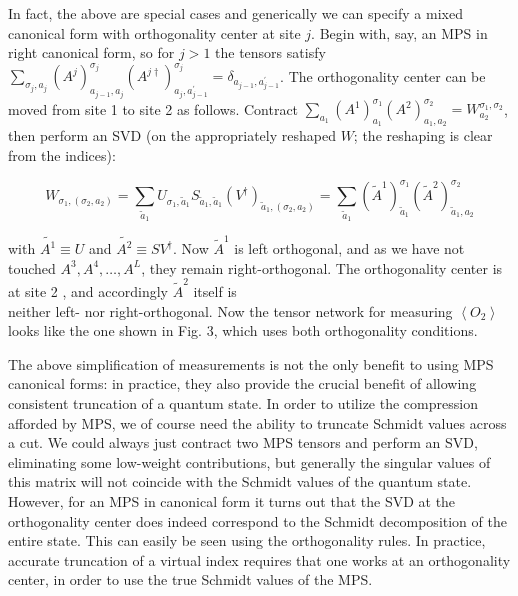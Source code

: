 \documentclass[12pt]{article}
\begin{document}
In fact, the above are special cases and generically we can specify a mixed canonical form with orthogonality center at site $j$. Begin with, say, an MPS in right canonical form, so for $j>1$ the tensors satisfy $\sum_{\sigma_{j}, a_{j}}\left(A^{j}\right)_{a_{j-1}, a_{j}}^{\sigma_{j}}\left(A^{j \dagger}\right)_{a_{j}, a_{j-1}^{\prime}}^{\sigma_{j}}=\delta_{a_{j-1}, a_{j-1}^{\prime}}$. The orthogonality center can be moved from site 1 to site 2 as follows. Contract $\sum_{a_{1}}\left(A^{1}\right)_{a_{1}}^{\sigma_{1}}\left(A^{2}\right)_{a_{1}, a_{2}}^{\sigma_{2}}=W_{a_{2}}^{\sigma_{1}, \sigma_{2}}$, then perform an SVD (on the appropriately reshaped $W$; the reshaping is clear from the indices):


\begin{equation*}
W_{\sigma_{1},\left(\sigma_{2}, a_{2}\right)}=\sum_{\tilde{a}_{1}} U_{\sigma_{1}, \tilde{a}_{1}} S_{\tilde{a}_{1}, \tilde{a}_{1}}\left(V^{\dagger}\right)_{\tilde{a}_{1},\left(\sigma_{2}, a_{2}\right)}=\sum_{\tilde{a}_{1}}\left(\tilde{A}^{1}\right)_{\tilde{a}_{1}}^{\sigma_{1}}\left(\tilde{A}^{2}\right)_{\tilde{a}_{1}, a_{2}}^{\sigma_{2}} \tag{8}
\end{equation*}


with $\tilde{A^{1}} \equiv U$ and $\tilde{A^{2}} \equiv S V^{\dagger}$. Now $\tilde{A}^{1}$ is left orthogonal, and as we have not touched $A^{3}, A^{4}, \ldots, A^{L}$, they remain right-orthogonal. The orthogonality center is at site 2 , and accordingly $\tilde{A}^{2}$ itself is\\
neither left- nor right-orthogonal. Now the tensor network for measuring $\left\langle O_{2}\right\rangle$ looks like the one shown in Fig. 3, which uses both orthogonality conditions.

The above simplification of measurements is not the only benefit to using MPS canonical forms: in practice, they also provide the crucial benefit of allowing consistent truncation of a quantum state. In order to utilize the compression afforded by MPS, we of course need the ability to truncate Schmidt values across a cut. We could always just contract two MPS tensors and perform an SVD, eliminating some low-weight contributions, but generally the singular values of this matrix will not coincide with the Schmidt values of the quantum state. However, for an MPS in canonical form it turns out that the SVD at the orthogonality center does indeed correspond to the Schmidt decomposition of the entire state. This can easily be seen using the orthogonality rules. In practice, accurate truncation of a virtual index requires that one works at an orthogonality center, in order to use the true Schmidt values of the MPS.
\end{document}
